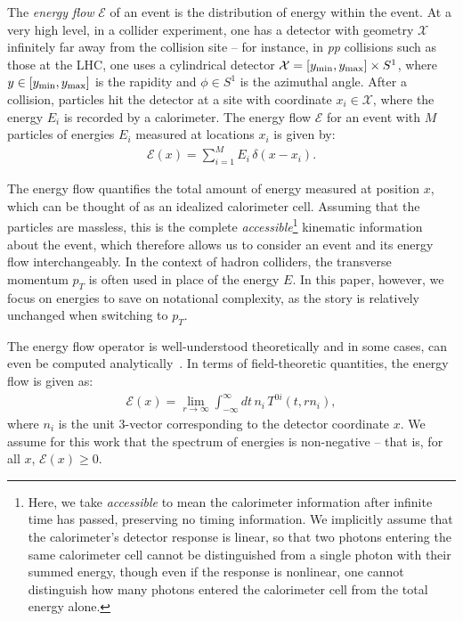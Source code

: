 \documentclass[letterpaper,11pt]{article}
\newcommand{\E}{\mathcal{E}}
\begin{document}
The \emph{energy flow} $\E$ of an event is the distribution of energy within the event.
%
At a very high level, in a collider experiment, one has a detector with geometry $\mathcal{X}$ infinitely far away from the collision site -- for instance, in \textit{pp} collisions such as those at the LHC, one uses a cylindrical detector $\mathcal{X} = [y_{\rm min}, y_{\rm max}] \times S^1$, where $y\in [y_{\rm min}, y_{\rm max}]$ is the rapidity and $\phi \in S^1$ is the azimuthal angle.
%
After a collision, particles hit the detector at a site with coordinate $x_i \in \mathcal{X}$, where the energy $E_i$ is recorded by a calorimeter.
%
The energy flow $\E$ for an event with $M$ particles of energies $E_i$ measured at locations $x_i$ is given by:
%
\begin{align}\label{eq:energyflow}
    \E(x) = \sum_{i=1}^M E_i \, \delta(x-x_i).
\end{align}

The energy flow quantifies the total amount of energy measured at position  $x$, which can be thought of as an idealized calorimeter cell. 
%
Assuming that the particles are massless, this is the complete \emph{accessible}\footnote{Here, we take \emph{accessible} to mean the calorimeter information after infinite time has passed, preserving no timing information. We implicitly assume that the calorimeter's detector response is linear, so that two photons entering the same calorimeter cell cannot be distinguished from a single photon with their summed energy, though even if the response is nonlinear, one cannot distinguish how many photons entered the calorimeter cell from the total energy alone.} kinematic information about the event, which therefore allows us to consider an event and its energy flow interchangeably.
%
In the context of hadron colliders, the transverse momentum $p_T$ is often used in place of the energy $E$.
%
In this paper, however, we focus on energies to save on notational complexity, as the story is relatively unchanged when switching to $p_T$.


The energy flow operator is well-understood theoretically and in some cases, can even be computed analytically~\cite{Tkachov:1995kk,Sveshnikov:1995vi,Korchemsky:1997sy,Basham:1978zq,Cherzor:1997ak,Tkachov:1999py,Korchemsky:1999kt,Belitsky:2001ij,Berger:2002jt,Bauer:2008dt,Hofman:2008ar,Mateu:2012nk,Belitsky:2013xxa}. In terms of field-theoretic quantities, the energy flow is given as:
%
\begin{align}
    \E(x) = \lim_{r\to \infty} \int_{-\infty}^\infty dt\, n_i \,T^{0i}(t, rn_i), \label{eq:stress_energy}
\end{align}
%
where $n_i$ is the unit 3-vector corresponding to the detector coordinate $x$.
%
We assume for this work that the spectrum of energies is non-negative -- that is, for all $x$, $\E(x) \geq 0$. 
\end{document}
